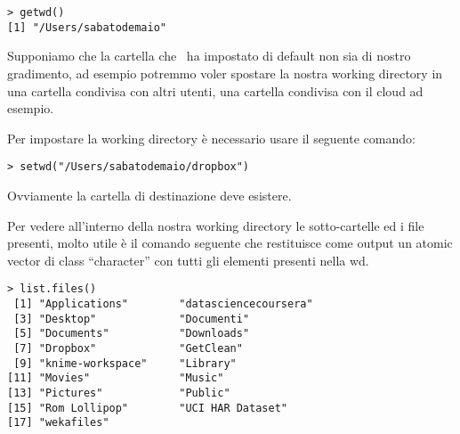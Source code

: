 \begin{lstlisting}
> getwd()
[1] "/Users/sabatodemaio"
\end{lstlisting}

Supponiamo che la cartella che \erre\ ha impostato di default non sia di nostro gradimento, ad esempio potremmo voler spostare la nostra working directory in una cartella condivisa con altri utenti, una cartella condivisa con il cloud ad esempio.

Per impostare la working directory è necessario usare il seguente comando:

\begin{lstlisting}
> setwd("/Users/sabatodemaio/dropbox")
\end{lstlisting}

Ovviamente la cartella di destinazione deve esistere.

Per vedere all'interno della nostra working directory le sotto-cartelle ed i file presenti, molto utile è il comando seguente che restituisce come output un atomic vector di class ``character'' con tutti gli elementi presenti nella wd.

\begin{lstlisting}
> list.files()
 [1] "Applications"        "datasciencecoursera"
 [3] "Desktop"             "Documenti"          
 [5] "Documents"           "Downloads"          
 [7] "Dropbox"             "GetClean"           
 [9] "knime-workspace"     "Library"            
[11] "Movies"              "Music"              
[13] "Pictures"            "Public"             
[15] "Rom Lollipop"        "UCI HAR Dataset"    
[17] "wekafiles"          
\end{lstlisting}


